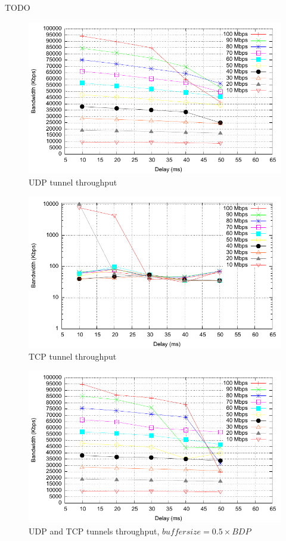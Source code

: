 TODO

\begin{figure}
  \centering
  \includegraphics[width=\textwidth]{img/test-udp}
  \caption{UDP tunnel throughput}
  \label{fig:udp}
\end{figure}

\begin{figure}
  \centering
  \includegraphics[width=\textwidth]{img/test-tcp}
  \caption{TCP tunnel throughput}
  \label{fig:tcp}
\end{figure}

\begin{figure}
  \centering
  \includegraphics[width=\textwidth]{img/test-mptcp-05}
  \caption{UDP and TCP tunnels throughput, $buffer size = 0.5 \times BDP$}
  \label{fig:mptcp-0.5}
\end{figure}

